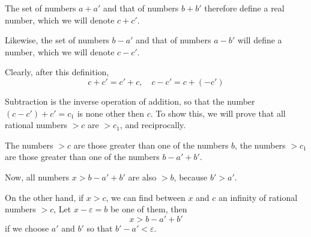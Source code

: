 \documentclass[10pt,letterpaper]{book}
\renewcommand\epsilon{\varepsilon}
\theoremstyle{definition}
\begin{document}
The set of numbers $a+a'$ and that of numbers $b+b'$ therefore define a real number, which we will denote $c+c'$.

Likewise, the set of numbers $b-a'$ and that of numbers $a-b'$ will define a number, which we will denote $c-c'$.

Clearly, after this definition,
\[
  c + c' = c' + c,\quad c-c'=c+(-c')
\]

Subtraction is the inverse operation of addition, so that the number $(c-c')+c'=c_1$ is none other then $c$. To show this, we will prove that all rational numbers $>c$ are $>c_1$, and reciprocally.

The numbers $> c$ are those greater than one of the numbers $b$, the numbers $> c_1$ are those greater than one of the numbers $b-a'+b'$.

Now, all numbers $x>b-a'+b'$ are also $>b$, because $b'> a'$.

On the other hand, if $x > c$, we can find between $x$ and $c$  an infinity of rational numbers $> c$, Let $x-\epsilon = b$ be one of them, then
\[
  x > b-a'+b'
\]
if we choose $a'$ and $b'$ so that $b'-a'< \epsilon$.

\begin{thebibliography}{9}

\end{thebibliography}
\end{document}
